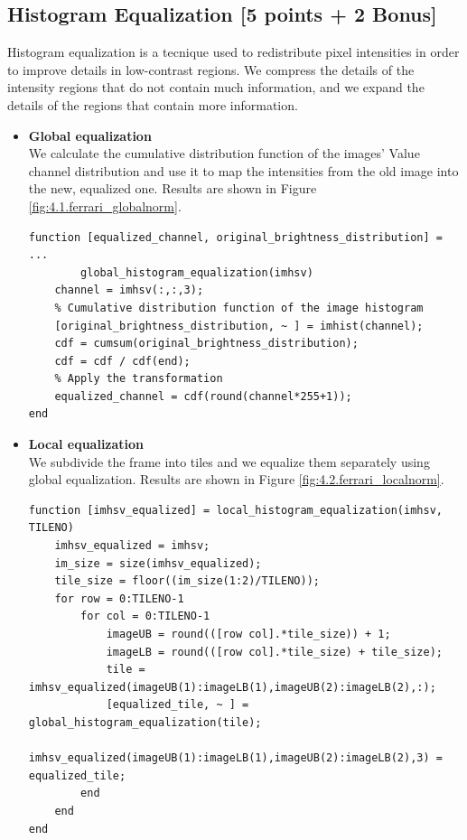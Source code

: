 \documentclass[tikz,14pt,fleqn]{article}
\begin{document}
\subsection{Histogram Equalization [5 points + 2 Bonus]}
Histogram equalization is a tecnique used to redistribute pixel intensities in order to improve details in low-contrast regions. We compress the details of the intensity regions that do not contain much information, and we expand the details of the regions that contain more information.
\begin{itemize}
    \item \textbf{Global equalization}\\
    We calculate the cumulative distribution function of the images' Value channel distribution and use it to map the intensities from the old image into the new, equalized one. Results are shown in Figure \ref{fig:4.1.ferrari_globalnorm}.
    \begin{verbatim} 
function [equalized_channel, original_brightness_distribution] = ...
        global_histogram_equalization(imhsv)
    channel = imhsv(:,:,3);
    % Cumulative distribution function of the image histogram
    [original_brightness_distribution, ~ ] = imhist(channel);
    cdf = cumsum(original_brightness_distribution);
    cdf = cdf / cdf(end);
    % Apply the transformation
    equalized_channel = cdf(round(channel*255+1));
end
    \end{verbatim}
    \item \textbf{Local equalization}\\
    We subdivide the frame into tiles and we equalize them separately using global equalization. Results are shown in Figure \ref{fig:4.2.ferrari_localnorm}.
    \begin{verbatim} 
function [imhsv_equalized] = local_histogram_equalization(imhsv, TILENO)
    imhsv_equalized = imhsv;
    im_size = size(imhsv_equalized);
    tile_size = floor((im_size(1:2)/TILENO));
    for row = 0:TILENO-1
        for col = 0:TILENO-1
            imageUB = round(([row col].*tile_size)) + 1;
            imageLB = round(([row col].*tile_size) + tile_size);
            tile = imhsv_equalized(imageUB(1):imageLB(1),imageUB(2):imageLB(2),:);
            [equalized_tile, ~ ] = global_histogram_equalization(tile);
            imhsv_equalized(imageUB(1):imageLB(1),imageUB(2):imageLB(2),3) = equalized_tile;
        end
    end
end
    \end{verbatim}

\end{itemize}
\end{document}
